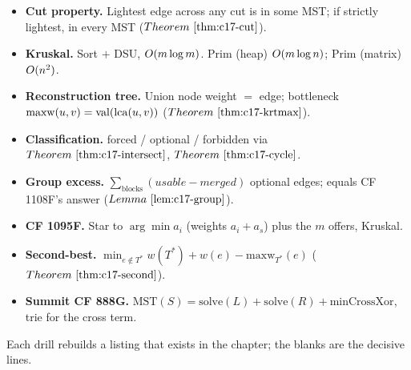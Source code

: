
\begin{quickref}
\begin{itemize}[nosep]
  \item \textbf{Cut property.}  Lightest edge across any cut is in some MST; if
        strictly lightest, in every MST (\(\thmref{c17-cut}\)).
  \item \textbf{Kruskal.}  Sort \(+\) DSU, \(O(m\log m)\).  Prim (heap)
        \(O(m\log n)\); Prim (matrix) \(O(n^2)\).
  \item \textbf{Reconstruction tree.}  Union node weight \(=\) edge; bottleneck
        \(\mathrm{maxw}(u,v)=\mathrm{val}(\operatorname{lca}(u,v))\) (\(\thmref{c17-krtmax}\)).
  \item \textbf{Classification.}  forced / optional / forbidden via
        \(\thmref{c17-intersect}\), \(\thmref{c17-cycle}\).
  \item \textbf{Group excess.}  \(\sum_{\text{blocks}}(\mathit{usable}-\mathit{merged})\)
        optional edges; equals CF 1108F's answer (\(\lemref{c17-group}\)).
  \item \textbf{CF 1095F.}  Star to \(\arg\min a_i\) (weights \(a_i+a_s\)) plus the
        \(m\) offers, Kruskal.
  \item \textbf{Second-best.}  \(\min_{e\notin T^{*}} w(T^{*})+w(e)-\mathrm{maxw}_{T^{*}}(e)\)
        (\(\thmref{c17-second}\)).
  \item \textbf{Summit CF 888G.}  \(\mathrm{MST}(S)=\mathrm{solve}(L)+\mathrm{solve}(R)+
        \text{minCrossXor}\), trie for the cross term.
\end{itemize}
\end{quickref}


Each drill rebuilds a listing that exists in the chapter; the blanks are the
decisive lines.

